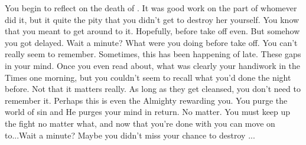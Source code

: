 \documentclass[char]{airship}
\begin{document}
  \memfold{$\alpha$} {You begin to reflect on
  the death of \cNPCWhore{\fullplain}.  It was good work on the part
  of whomever did it, but it quite the pity that you didn't get to
  destroy her yourself.  You know that you meant to get around to it.
  Hopefully, before take off even.  But somehow you got delayed.  Wait
  a minute?  What were you doing before take off.  You can't really
  seem to remember.  Sometimes, this has been happening of late.
  These gaps in your mind.  Once you even read about, what was clearly
  your handiwork in the Times one morning, but you couldn't seem to
  recall what you'd done the night before.  Not that it matters
  really.  As long as they get cleansed, you don't need to remember
  it.  Perhaps this is even the Almighty rewarding you.  You purge the
  world of sin and He purges your mind in return.  No matter.  You
  must keep up the fight no matter what, and now that you're done with
  \cNPCWhore{\informal} you can move on to...Wait a minute?  Maybe you
  didn't miss your chance to destroy \cNPCWhore{\informal}...}




\endtag
\end{document}
